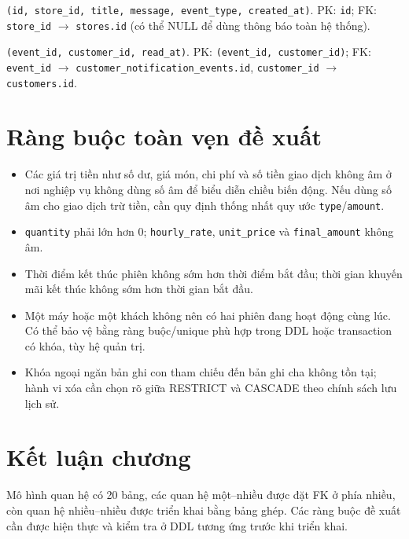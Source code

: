 \begin{description}[leftmargin=4.2cm,labelwidth=4.0cm,style=nextline]
  \item[\texttt{customer\_notification\_events}] \texttt{(id, store\_id, title, message, event\_type, created\_at)}. PK: \texttt{id}; FK: \texttt{store\_id} $\rightarrow$ \texttt{stores.id} (có thể NULL để dùng thông báo toàn hệ thống).
  \item[\texttt{customer\_notification\_reads}] \texttt{(event\_id, customer\_id, read\_at)}. PK: \texttt{(event\_id, customer\_id)}; FK: \texttt{event\_id} $\rightarrow$ \texttt{customer\_notification\_events.id}, \texttt{customer\_id} $\rightarrow$ \texttt{customers.id}.
\end{description}

\section{Ràng buộc toàn vẹn đề xuất}
\begin{itemize}
  \item Các giá trị tiền như số dư, giá món, chi phí và số tiền giao dịch không âm ở nơi nghiệp vụ không dùng số âm để biểu diễn chiều biến động. Nếu dùng số âm cho giao dịch trừ tiền, cần quy định thống nhất quy ước \texttt{type}/\texttt{amount}.
  \item \texttt{quantity} phải lớn hơn 0; \texttt{hourly\_rate}, \texttt{unit\_price} và \texttt{final\_amount} không âm.
  \item Thời điểm kết thúc phiên không sớm hơn thời điểm bắt đầu; thời gian khuyến mãi kết thúc không sớm hơn thời gian bắt đầu.
  \item Một máy hoặc một khách không nên có hai phiên đang hoạt động cùng lúc. Có thể bảo vệ bằng ràng buộc/unique phù hợp trong DDL hoặc transaction có khóa, tùy hệ quản trị.
  \item Khóa ngoại ngăn bản ghi con tham chiếu đến bản ghi cha không tồn tại; hành vi xóa cần chọn rõ giữa RESTRICT và CASCADE theo chính sách lưu lịch sử.
\end{itemize}

\section{Kết luận chương}
Mô hình quan hệ có 20 bảng, các quan hệ một--nhiều được đặt FK ở phía nhiều, còn quan hệ nhiều--nhiều được triển khai bằng bảng ghép. Các ràng buộc đề xuất cần được hiện thực và kiểm tra ở DDL tương ứng trước khi triển khai.
